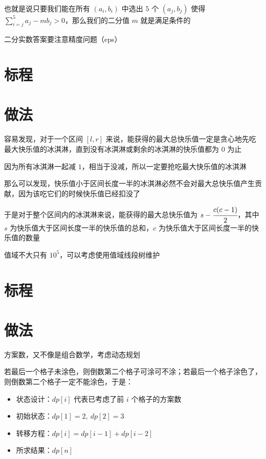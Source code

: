 \documentclass{ctsol}
\begin{document}
也就是说只要我们能在所有 $(a_i,b_i)$ 中选出 $5$ 个 $(a_j,b_j)$ 使得 $\sum_{i=j}^{5}a_j-mb_j > 0$，那么我们的二分值 $m$ 就是满足条件的

二分实数答案要注意精度问题（eps）

\section*{标程}


\makesolution
\section*{做法}

容易发现，对于一个区间 $[l,r]$ 来说，能获得的最大总快乐值一定是贪心地先吃最大快乐值的冰淇淋，直到没有冰淇淋或剩余的冰淇淋的快乐值都为 $0$ 为止

因为所有冰淇淋一起减 $1$，相当于没减，所以一定要抢吃最大快乐值的冰淇淋

那么可以发现，快乐值小于区间长度一半的冰淇淋必然不会对最大总快乐值产生贡献，因为该吃它们的时候快乐值已经扣没了

于是对于整个区间内的冰淇淋来说，能获得的最大总快乐值为 $s-\cfrac{c(c-1)}{2}$，其中 $s$ 为快乐值大于区间长度一半的快乐值的总和，$c$ 为快乐值大于区间长度一半的快乐值的数量

值域不大只有 ${10}^5$，可以考虑使用值域线段树维护

\section*{标程}


\makesolution
\section*{做法}

方案数，又不像是组合数学，考虑动态规划

若最后一个格子未涂色，则倒数第二个格子可涂可不涂；若最后一个格子涂色了，则倒数第二个格子一定不能涂色，于是：

\begin{itemize}
    \item 状态设计：$dp[i]$ 代表已考虑了前 $i$ 个格子的方案数
    \item 初始状态：$dp[1] = 2,~dp[2] = 3$
    \item 转移方程：$dp[i] = dp[i-1] + dp[i-2]$
    \item 所求结果：$dp[n]$
\end{itemize}
\end{document}
